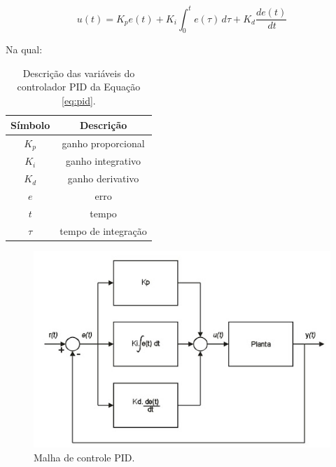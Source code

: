 \begin{equation}
    u(t) = K_pe(t) + K_i  \int_{0}^{t} e(\tau) \, d\tau + K_d\dfrac{de(t)}{\, dt}
    \label{eq:pid}
\end{equation}

Na qual:

\begin{table}[H]
    \begin{center}
        \begin{tabular}{ |c|c| } 
            \hline
            Símbolo   &  Descrição  \\
            \hline
            \(K_p\)   &  ganho proporcional  \\
            \hline
            \(K_i\)   &  ganho integrativo  \\
            \hline
            \(K_d\)   &  ganho derivativo  \\
            \hline
            \(e\)   &  erro  \\
            \hline
            \(t\)   &  tempo  \\
            \hline
            \(\tau\)   &  tempo de integração \\
            \hline
        \end{tabular}
        \caption{\label{tab:variaveis_pid}Descrição das variáveis do controlador PID da Equação \ref{eq:pid}.}
    \end{center}
\end{table}

\begin{figure}[h]
    \centering
    \includegraphics[scale=0.60]{figuras/implementacao/hardware/pid.jpg}
    \caption{Malha de controle PID.}
    \label{fig:pid}
\end{figure}


